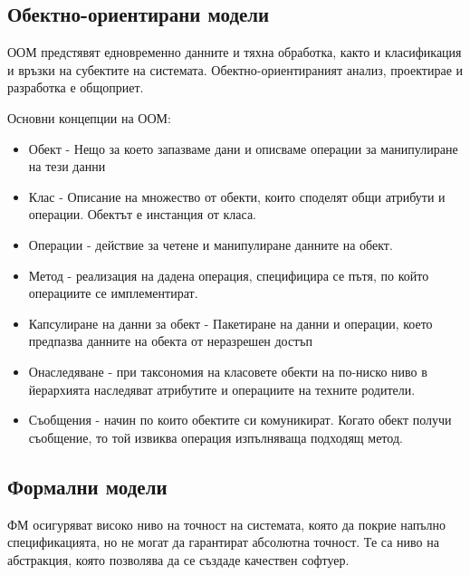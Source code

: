 \documentclass[fleqn,12pt]{article}
\begin{document}
\subsection{Обектно-ориентирани модели}
ООМ предстявят едновременно данните и тяхна обработка, както и класификация и връзки на субектите на системата. Обектно-ориентираният анализ, проектирае и разработка е общоприет.

Основни концепции на ООМ:
\begin{itemize}
	\item Обект - Нещо за което запазваме дани и описваме операции за манипулиране на тези данни
	\item Клас - Описание на множество от обекти, които споделят общи атрибути и операции. Обектът е инстанция от класа.
	\item Операции - действие за четене и манипулиране данните на обект. 
	\item Метод - реализация на дадена операция, специфицира се пътя, по който операциите се имплементират.
	\item Капсулиране на данни за обект - Пакетиране на данни и операции, което предпазва данните на обекта от неразрешен достъп
	\item Онаследяване - при таксономия на класовете обекти на по-ниско ниво в йерархията наследяват атрибутите и операциите на техните родители.
	\item Съобщения - начин по които обектите си комуникират. Когато обект получи съобщение, то той извиква операция изпълняваща подходящ метод.
\end{itemize}


\subsection{Формални модели}
ФМ осигуряват високо ниво на точност на системата, която да покрие напълно спецификацията, но не могат да гарантират абсолютна точност. Те са ниво на абстракция, която позволява да се създаде качествен софтуер. 
\end{document}
